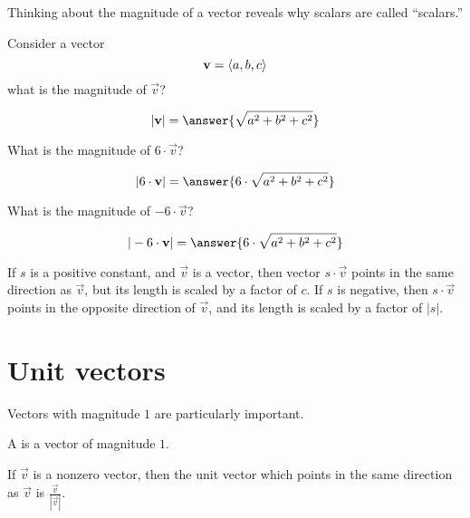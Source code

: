 \documentclass{ximera}
\begin{document}
Thinking about the magnitude of a vector reveals why scalars are
called ``scalars.''

\begin{question}
  Consider a vector
  \[
  \mathbf{v} = \left\langle a,b,c\right\rangle
  \]
  what is the magnitude of $\vec{v}$?
  \begin{prompt}
    \[
    |\vec{v}| = \answer{\sqrt{a^2+b^2+c^2}}
    \]
  \end{prompt}
  \begin{question}
    What is the magnitude of $6\cdot\vec{v}$?
    \begin{prompt}
      \[
      |6\cdot\vec{v}| = \answer{6\cdot\sqrt{a^2+b^2+c^2}}
      \]
    \end{prompt}
    \begin{question}
    What is the magnitude of $-6\cdot\vec{v}$?
    \begin{prompt}
      \[
      |-6\cdot\vec{v}| = \answer{6\cdot\sqrt{a^2+b^2+c^2}}
      \]
    \end{prompt}
    \begin{feedback}
      If $s$ is a positive constant, and $\vec{v}$ is a vector, then
      vector $s\cdot\vec{v}$ points in the same direction as
      $\vec{v}$, but its length is scaled by a factor of $c$.  If $s$
      is negative, then $s\cdot\vec{v}$ points in the opposite
      direction of $\vec{v}$, and its length is scaled by a factor of
      $|s|$.
    \end{feedback}
  \end{question}
  \end{question}
\end{question}


\section{Unit vectors}

Vectors with magnitude $1$ are particularly important.

\begin{definition}
  A  is a vector of magnitude $1$.
\end{definition}

\begin{theorem}
  If $\vec{v}$ is a nonzero vector, then the unit vector which points
  in the same direction as $\vec{v}$ is $\frac{\vec{v}}{|\vec{v}|}$.
\end{theorem}
\end{document}
